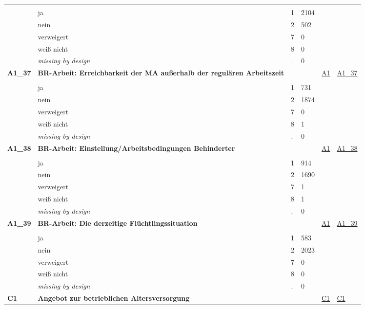 \begin{longtable}{| L{2.45cm} | L{6cm} | C{1.5cm} | R{1cm} | C{2.25cm} | C{2.25cm} |}
   &  &  &  &  &  \\ 
   & ja & 1 & 2104 &  &  \\ 
   & nein & 2 & 502 &  &  \\ 
   & verweigert & 7 & 0 &  &  \\ 
   & weiß nicht & 8 & 0 &  &  \\ 
   & \textit{missing by design} & \textit{.} & 0 &  &  \\ 
   \midrule
\textbf{A1\_37}\label{var:A1:37} & \textbf{BR-Arbeit: Erreichbarkeit der MA außerhalb der regulären Arbeitszeit} &  &  & \hyperref[A1]{A1} & \hyperref[var:suf:A1:37]{A1\_37} \\ 
   &  &  &  &  &  \\ 
   & ja & 1 & 731 &  &  \\ 
   & nein & 2 & 1874 &  &  \\ 
   & verweigert & 7 & 0 &  &  \\ 
   & weiß nicht & 8 & 1 &  &  \\ 
   & \textit{missing by design} & \textit{.} & 0 &  &  \\ 
   \midrule
\textbf{A1\_38}\label{var:A1:38} & \textbf{BR-Arbeit: Einstellung/Arbeitsbedingungen Behinderter} &  &  & \hyperref[A1]{A1} & \hyperref[var:suf:A1:38]{A1\_38} \\ 
   &  &  &  &  &  \\ 
   & ja & 1 & 914 &  &  \\ 
   & nein & 2 & 1690 &  &  \\ 
   & verweigert & 7 & 1 &  &  \\ 
   & weiß nicht & 8 & 1 &  &  \\ 
   & \textit{missing by design} & \textit{.} & 0 &  &  \\ 
   \midrule
\textbf{A1\_39}\label{var:A1:39} & \textbf{BR-Arbeit: Die derzeitige Flüchtlingssituation} &  &  & \hyperref[A1]{A1} & \hyperref[var:suf:A1:39]{A1\_39} \\ 
   &  &  &  &  &  \\ 
   & ja & 1 & 583 &  &  \\ 
   & nein & 2 & 2023 &  &  \\ 
   & verweigert & 7 & 0 &  &  \\ 
   & weiß nicht & 8 & 0 &  &  \\ 
   & \textit{missing by design} & \textit{.} & 0 &  &  \\ 
   \midrule
\textbf{C1}\label{var:C1} & \textbf{Angebot zur betrieblichen Altersversorgung} &  &  & \hyperref[C1]{C1} & \hyperref[var:suf:C1]{C1} \\ 

\end{longtable}
